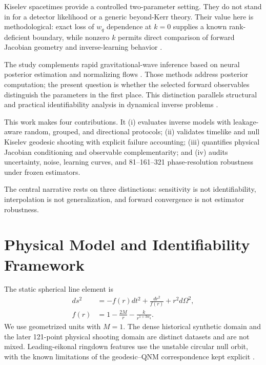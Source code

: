 \documentclass[10pt,twocolumn]{article}
\newcommand{\wq}{w_q}
\begin{document}
Kiselev spacetimes provide a controlled two-parameter setting. They do not
stand in for a detector likelihood or a generic beyond-Kerr theory. Their value
here is methodological: exact loss of $\wq$ dependence at $k=0$ supplies a known
rank-deficient boundary, while nonzero $k$ permits direct comparison of forward
Jacobian geometry and inverse-learning behavior \cite{kiselev2003quintessence}.

The study complements rapid gravitational-wave inference based on neural
posterior estimation and normalizing flows
\cite{dax2021realtime,green2020autoregressive,gabbard2022cvae,cranmer2020frontier,papamakarios2021normalizing}.
Those methods address posterior computation; the present question is whether
the selected forward observables distinguish the parameters in the first
place. This distinction parallels structural and practical identifiability
analysis in dynamical inverse problems \cite{raue2009identifiability,villaverde2019identifiability}.

This work makes four contributions. It (i) evaluates inverse models with
leakage-aware random, grouped, and directional protocols; (ii) validates
timelike and null Kiselev geodesic shooting with explicit failure accounting;
(iii) quantifies physical Jacobian conditioning and observable
complementarity; and (iv) audits uncertainty, noise, learning curves, and
81--161--321 phase-resolution robustness under frozen estimators.

The central narrative rests on three distinctions: sensitivity is not
identifiability, interpolation is not generalization, and forward convergence
is not estimator robustness.

\section{Physical Model and Identifiability Framework}
The static spherical line element is
\begin{align}
 ds^2&=-f(r)dt^2+\frac{dr^2}{f(r)}+r^2d\Omega^2,\\
 f(r)&=1-\frac{2M}{r}-\frac{k}{r^{1+3\wq}}.
\end{align}
We use geometrized units with $M=1$. The dense historical synthetic domain and
the later 121-point physical shooting domain are distinct datasets and are not
mixed. Leading-eikonal ringdown features use the unstable circular null orbit,
with the known limitations of the geodesic--QNM correspondence kept explicit
\cite{cardoso2009geodesic,konoplya2017correspondence,palominoylla2026ringdown}.
\end{document}
